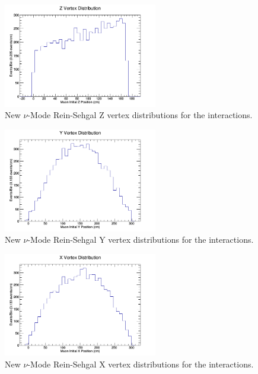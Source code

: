 \documentclass[11pt]{article}
\begin{document}
\begin{figure}[H]
\centering
\includegraphics[width=0.6\textwidth]{NewNMReinSehgalImages/2-ZVertexDistributionNMRS.png}
\caption{New $\nu$-Mode Rein-Sehgal Z vertex distributions for the interactions.}
\end{figure}

\begin{figure}[H]
\centering
\includegraphics[width=0.6\textwidth]{NewNMReinSehgalImages/3-YVertexDistributionNMRS.png}
\caption{New $\nu$-Mode Rein-Sehgal Y vertex distributions for the interactions.}
\end{figure}

\begin{figure}[H]
\centering
\includegraphics[width=0.6\textwidth]{NewNMReinSehgalImages/4-XVertexDistributionNMRS.png}
\caption{New $\nu$-Mode Rein-Sehgal X vertex distributions for the interactions.}
\end{figure}
\end{document}

